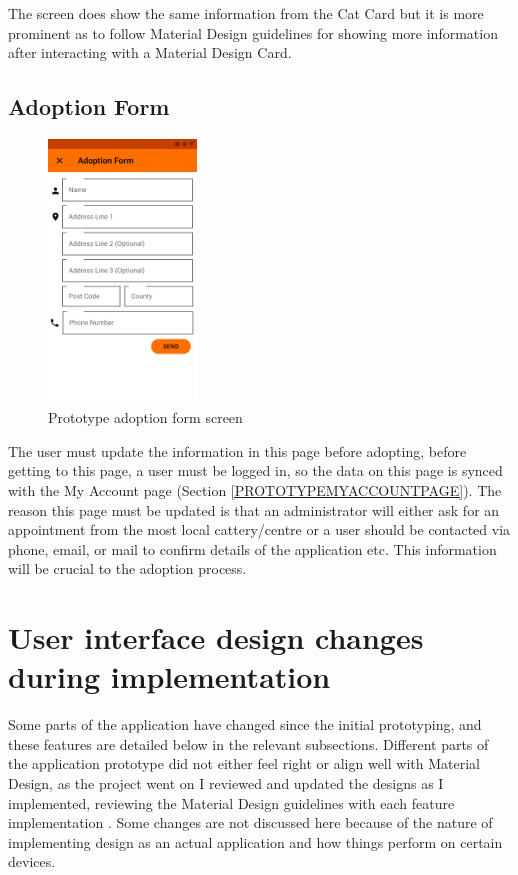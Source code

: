 The screen does show the same information from the Cat \gls{Card} but it is more prominent as to follow Material Design guidelines for showing more information after interacting with a Material Design \gls{Card}.

\subsection{Adoption Form}

\begin{figure} [htbp!]
    \centering
    \includegraphics[height=7cm]{Images/PrototypeAdoptForm.png}
    \caption{Prototype adoption form screen}
    \label{fig:prototype_adoption_form_screen}
\end{figure}

The user must update the information in this page before adopting, before getting to this page, a user must be logged in, so the data on this page is synced with the My Account page (Section \ref{PROTOTYPEMYACCOUNTPAGE}). The reason this page must be updated is that an administrator will either ask for an appointment from the most local cattery/centre or a user should be contacted via phone, email, or mail to confirm details of the application etc. This information will be crucial to the adoption process.

\section{User interface design changes during implementation} \label{DESIGNCHANGESSECTION}
Some parts of the application have changed since the initial prototyping, and these features are detailed below in the relevant subsections. Different parts of the application prototype did not either feel right or align well with Material Design, as the project went on I reviewed and updated the designs as I implemented, reviewing the Material Design guidelines with each feature implementation \cite{MATERIALDESIGNGUIDELINES}. Some changes are not discussed here because of the nature of implementing design as an actual application and how things perform on certain devices.

